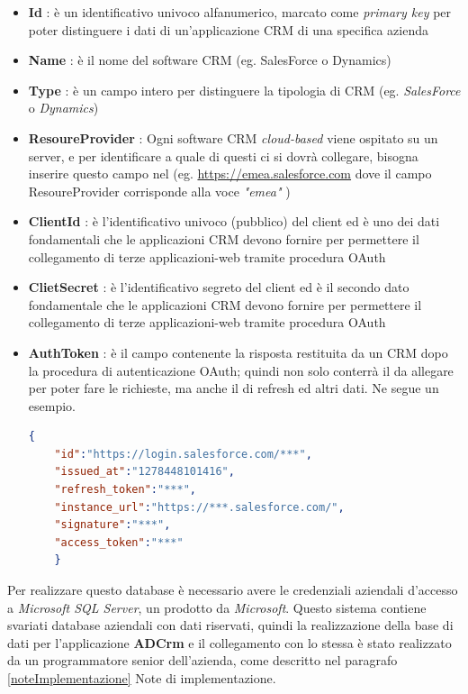\begin{itemize}
	\item \textbf{Id} : è un identificativo univoco alfanumerico, marcato come \textit{primary key} per poter distinguere i dati di  un'applicazione \gls{CRM} di una specifica azienda
	\item \textbf{Name} : è il nome del software \gls{CRM} (eg. SalesForce o Dynamics)
	\item \textbf{Type} : è un campo intero per distinguere la tipologia di \gls{CRM} (eg. \textit{SalesForce} o \textit{Dynamics})  
	\item \textbf{ResoureProvider} :
	Ogni software \gls{CRM} \textit{cloud-based} viene ospitato su un server, e per identificare a quale di questi ci si dovrà collegare, bisogna inserire questo campo nel  (eg. \url{https://emea.salesforce.com} dove il campo ResoureProvider corrisponde alla voce \textit{"emea"} )
	\item \textbf{ClientId} : è l’identificativo univoco (pubblico) del client ed è uno dei dati fondamentali che le applicazioni \gls{CRM} devono fornire per permettere il collegamento di terze applicazioni-web tramite procedura OAuth
	\item \textbf{ClietSecret} :  è l’identificativo segreto del client ed è il secondo dato fondamentale che le applicazioni \gls{CRM} devono fornire per permettere il collegamento di terze applicazioni-web tramite procedura OAuth
	\item \textbf{AuthToken} : è il campo contenente la risposta  restituita da un \gls{CRM} dopo la procedura di autenticazione OAuth; quindi non solo conterrà il  da allegare per poter fare le richieste, ma anche il  di refresh ed altri dati. Ne segue un esempio.
	
	
	\begin{lstlisting}[language=json,firstnumber=1]
	{
	"id":"https://login.salesforce.com/***",
	"issued_at":"1278448101416",
	"refresh_token":"***",
	"instance_url":"https://***.salesforce.com/",
	"signature":"***",
	"access_token":"***"
	}
	\end{lstlisting}
	
\end{itemize}

Per realizzare questo database  è necessario avere le credenziali aziendali d'accesso a \textit{Microsoft SQL Server}, un \textit{} prodotto da \textit{Microsoft}. Questo sistema contiene svariati database aziendali con dati riservati, quindi la realizzazione della base di dati per l'applicazione \textbf{ADCrm} e il collegamento con lo stessa è stato realizzato da un programmatore senior dell'azienda, come descritto nel paragrafo \ref{noteImplementazione} Note di implementazione. 

